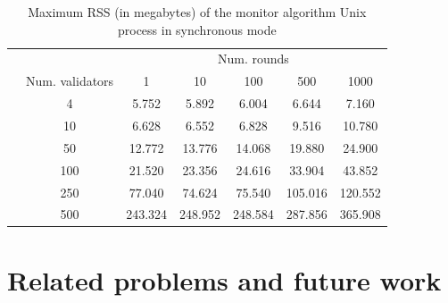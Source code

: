 \documentclass[a4paper,11pt,oneside]{report}
\begin{document}
\begin{table}[]
\centering
\begin{tabular}{l|c|c|c|c|c|c|}
\cline{2-7}
                  &  & \multicolumn{5}{c|}{Num. rounds} \\ \cline{2-7} 
\multirow{7}{*}{} & Num. validators & 1   & 10   & 100  & 500  & 1000  \\ \cline{2-7} 
                  & 4               & 5.752  & 5.892  & 6.004 & 6.644 & 7.160      \\ \cline{2-7} 
                  & 10              & 6.628    & 6.552     &  6.828   & 9.516  & 10.780      \\ \cline{2-7} 
                  & 50              & 12.772    & 13.776    & 14.068     &  19.880    &  24.900     \\ \cline{2-7} 
                  & 100             & 21.520  & 23.356    & 24.616  & 33.904     & 43.852      \\ \cline{2-7} 
                  & 250             &  77.040   & 74.624     &  75.540    &  105.016    &  120.552     \\ \cline{2-7} 
                  & 500             & 243.324    & 248.952     &  248.584    &  287.856    & 365.908      \\ \cline{2-7} 
\end{tabular}
\caption{Maximum RSS (in megabytes) of the monitor algorithm Unix process in synchronous mode}
\end{table}


\chapter{Related problems and future work}
\end{document}
